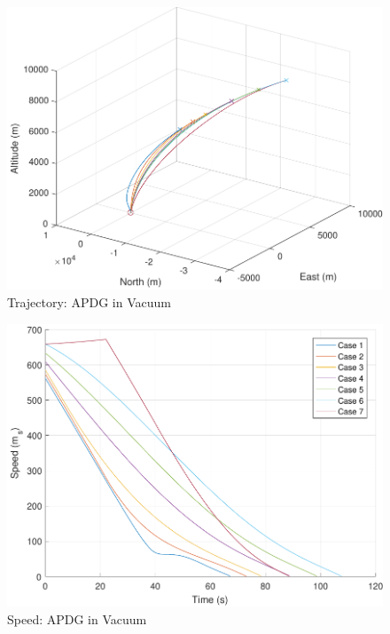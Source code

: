 \begin{figure}[H]
	\centering
	\begin{minipage}{4.5 in}
		\includegraphics[width=\linewidth]{Figures/trajpowvac.pdf}
		\caption{Trajectory: APDG in Vacuum \label{fig:trajpowvac} }
	\end{minipage}
\end{figure}

\begin{figure}[H]
	\centering
	\begin{minipage}{4.5 in}
		\includegraphics[width=\linewidth]{Figures/spdpowvac.pdf}
		\caption{Speed: APDG in Vacuum \label{fig:spdpowvac} }
	\end{minipage}
\end{figure}

